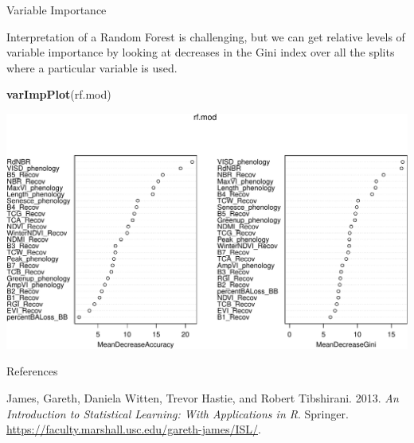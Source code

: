 \documentclass[
  ignorenonframetext,
]{beamer}
\newenvironment{Shaded}{\begin{snugshade}}{\end{snugshade}}
\newcommand{\KeywordTok}[1]{\textcolor[rgb]{0.13,0.29,0.53}{\textbf{#1}}}
\newcommand{\NormalTok}[1]{#1}
\begin{document}
\begin{frame}[fragile]{Variable Importance}
\protect\hypertarget{variable-importance}{}

Interpretation of a Random Forest is challenging, but we can get
relative levels of variable importance by looking at decreases in the
Gini index over all the splits where a particular variable is used.

\scriptsize

\begin{Shaded}
\begin{Highlighting}[]
\KeywordTok{varImpPlot}\NormalTok{(rf.mod)}
\end{Highlighting}
\end{Shaded}

\includegraphics{classify_files/figure-beamer/unnamed-chunk-12-1.pdf}

\end{frame}

\begin{frame}{References}
\protect\hypertarget{references}{}

\hypertarget{refs}{}
\leavevmode\hypertarget{ref-islr}{}%
James, Gareth, Daniela Witten, Trevor Hastie, and Robert Tibshirani.
2013. \emph{An Introduction to Statistical Learning: With Applications
in R}. Springer.
\url{https://faculty.marshall.usc.edu/gareth-james/ISL/}.

\end{frame}
\end{document}
